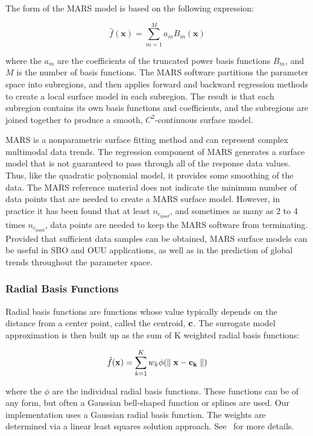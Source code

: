 The form of the MARS model is based on the following expression:

\begin{equation}
  \hat{f}(\mathbf{x})=\sum_{m=1}^{M}a_{m}B_{m}(\mathbf{x})
  \label{models:surf:equation10}  
\end{equation}

where the $a_{m}$ are the coefficients of the truncated power basis
functions $B_{m}$, and $M$ is the number of basis functions. The MARS
software partitions the parameter space into subregions, and then
applies forward and backward regression methods to create a local
surface model in each subregion. The result is that each subregion
contains its own basis functions and coefficients, and the subregions
are joined together to produce a smooth, $C^{2}$-continuous surface
model.

MARS is a nonparametric surface fitting method and can represent
complex multimodal data trends. The regression component of MARS
generates a surface model that is not guaranteed to pass through all
of the response data values. Thus, like the quadratic polynomial
model, it provides some smoothing of the data. The MARS reference
material does not indicate the minimum number of data points that are
needed to create a MARS surface model. However, in practice it has
been found that at least $n_{c_{quad}}$, and sometimes as many as 2 to
4 times $n_{c_{quad}}$, data points are needed to keep the MARS
software from terminating.  Provided that sufficient data samples can
be obtained, MARS surface models can be useful in SBO and OUU
applications, as well as in the prediction of global trends throughout
the parameter space.

\subsubsection{Radial Basis Functions}\label{models:surf:rbf}

Radial basis functions are functions whose value typically depends on the 
distance from a center point, called the centroid, ${\bf c}$. 
The surrogate model approximation is then built up as the sum of K 
weighted radial basis functions: 

\begin{equation}
  \hat{f}({\bf x})=\sum_{k=1}^{K}w_{k}\phi({\parallel {\bf x} - {\bf c_{k}} \parallel})
  \label{models:surf:equation11}  
\end{equation}

where the $\phi$ are the individual radial basis functions.  
These functions can be of any form, but often a Gaussian bell-shaped 
function or splines are used.  
Our implementation uses a Gaussian radial basis function. 
The weights are determined via a linear least squares solution approach.
See~\cite{Orr96} for more details.

